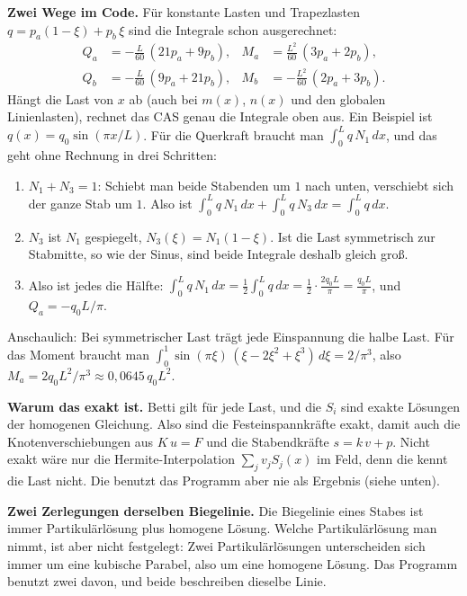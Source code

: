 \textbf{Zwei Wege im Code.} Für konstante Lasten und Trapezlasten
$q = p_a(1-\xi) + p_b\,\xi$ sind die Integrale schon ausgerechnet:
\begin{align*}
  Q_a &= -\tfrac{L}{60}\,(21p_a + 9p_b),   & M_a &= \tfrac{L^2}{60}\,(3p_a + 2p_b), \\
  Q_b &= -\tfrac{L}{60}\,(9p_a + 21p_b),   & M_b &= -\tfrac{L^2}{60}\,(2p_a + 3p_b).
\end{align*}
Hängt die Last von $x$ ab (auch bei $m(x)$, $n(x)$ und den globalen Linienlasten), rechnet das CAS
genau die Integrale oben aus. Ein Beispiel ist $q(x) = q_0 \sin(\pi x/L)$. Für die Querkraft
braucht man $\int_0^L q\,N_1\,dx$, und das geht ohne Rechnung in drei Schritten:
\begin{enumerate}
  \item $N_1 + N_3 = 1$: Schiebt man beide Stabenden um $1$ nach unten, verschiebt sich der ganze
        Stab um $1$. Also ist $\int_0^L q\,N_1\,dx + \int_0^L q\,N_3\,dx = \int_0^L q\,dx$.
  \item $N_3$ ist $N_1$ gespiegelt, $N_3(\xi) = N_1(1-\xi)$. Ist die Last symmetrisch zur
        Stabmitte, so wie der Sinus, sind beide Integrale deshalb gleich groß.
  \item Also ist jedes die Hälfte: $\int_0^L q\,N_1\,dx = \frac12 \int_0^L q\,dx
        = \frac12 \cdot \frac{2q_0L}{\pi} = \frac{q_0L}{\pi}$, und $Q_a = -q_0L/\pi$.
\end{enumerate}
Anschaulich: Bei symmetrischer Last trägt jede Einspannung die halbe Last. Für das Moment
braucht man $\int_0^1 \sin(\pi\xi)\,(\xi - 2\xi^2 + \xi^3)\,d\xi = 2/\pi^3$, also
$M_a = 2q_0L^2/\pi^3 \approx 0{,}0645\,q_0L^2$.

\textbf{Warum das exakt ist.} Betti gilt für jede Last, und die $S_i$ sind exakte Lösungen der
homogenen Gleichung. Also sind die Festeinspannkräfte exakt, damit auch die Knotenverschiebungen aus
$K\,u = F$ und die Stabendkräfte $s = k\,v + p$. Nicht exakt wäre nur die Hermite-Interpolation
$\sum_j v_j S_j(x)$ im Feld, denn die kennt die Last nicht. Die benutzt das Programm aber nie als
Ergebnis (siehe unten).

\textbf{Zwei Zerlegungen derselben Biegelinie.} Die Biegelinie eines Stabes ist immer
Partikulärlösung plus homogene Lösung. Welche Partikulärlösung man nimmt, ist aber nicht
festgelegt: Zwei Partikulärlösungen unterscheiden sich immer um eine kubische Parabel, also um eine
homogene Lösung. Das Programm benutzt zwei davon, und beide beschreiben dieselbe Linie.

